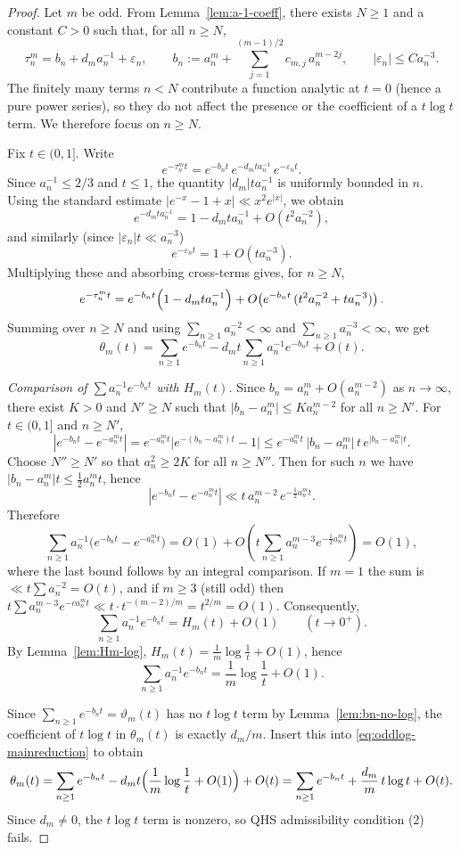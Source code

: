 \documentclass[11pt,letterpaper]{amsart}
\numberwithin{equation}{section}
\theoremstyle{definition}
\begin{document}
\begin{proof}
Let $m$ be odd. From Lemma~\ref{lem:a-1-coeff}, there exists $N\ge1$ and a constant $C>0$ such that,
for all $n\ge N$,
\[
\tau_n^m = b_n + d_m a_n^{-1} + \varepsilon_n,
\qquad
b_n:=a_n^m+\sum_{j=1}^{(m-1)/2} c_{m,j}\,a_n^{m-2j},
\qquad
|\varepsilon_n|\le C a_n^{-3}.
\]
The finitely many terms $n<N$ contribute a function analytic at $t=0$ (hence a pure power series),
so they do not affect the presence or the coefficient of a $t\log t$ term. We therefore focus on $n\ge N$.

Fix $t\in(0,1]$. Write
\[
e^{-\tau_n^m t}=e^{-b_n t}\,e^{-d_m t a_n^{-1}}\,e^{-\varepsilon_n t}.
\]
Since $a_n^{-1}\le 2/3$ and $t\le1$, the quantity $|d_m|t a_n^{-1}$ is uniformly bounded in $n$.
Using the standard estimate $|e^{-x}-1+x|\ll x^2 e^{|x|}$, we obtain
\[
e^{-d_m t a_n^{-1}} = 1 - d_m t a_n^{-1} + O(t^2 a_n^{-2}),
\]
and similarly (since $|\varepsilon_n|t\ll a_n^{-3}$)
\[
e^{-\varepsilon_n t}=1+O(t a_n^{-3}).
\]
Multiplying these and absorbing cross-terms gives, for $n\ge N$,
\[
e^{-\tau_n^m t}
= e^{-b_n t}\Bigl(1-d_m t a_n^{-1}\Bigr)+O\!\left(e^{-b_n t}\,(t^2 a_n^{-2}+t a_n^{-3})\right).
\]
Summing over $n\ge N$ and using $\sum_{n\ge1}a_n^{-2}<\infty$ and $\sum_{n\ge1}a_n^{-3}<\infty$, we get
\begin{equation}\label{eq:oddlog-mainreduction}
\theta_m(t)
=\sum_{n\ge1}e^{-b_n t} - d_m t\sum_{n\ge1}a_n^{-1}e^{-b_n t} + O(t).
\end{equation}

\medskip
\noindent\emph{Comparison of $\sum a_n^{-1}e^{-b_n t}$ with $H_m(t)$.}
Since $b_n=a_n^m+O(a_n^{m-2})$ as $n\to\infty$, there exist $K>0$ and $N'\ge N$ such that
$|b_n-a_n^m|\le K a_n^{m-2}$ for all $n\ge N'$. For $t\in(0,1]$ and $n\ge N'$,
\[
|e^{-b_n t}-e^{-a_n^m t}|
=e^{-a_n^m t}\bigl|e^{-(b_n-a_n^m)t}-1\bigr|
\le e^{-a_n^m t}\,|b_n-a_n^m|\,t\,e^{|b_n-a_n^m|t}.
\]
Choose $N''\ge N'$ so that $a_n^2\ge 2K$ for all $n\ge N''$. Then for such $n$ we have
$|b_n-a_n^m|t\le \frac12 a_n^m t$, hence
\[
|e^{-b_n t}-e^{-a_n^m t}|\ll t\,a_n^{m-2}\,e^{-\frac12 a_n^m t}.
\]
Therefore
\[
\sum_{n\ge1}a_n^{-1}\bigl(e^{-b_n t}-e^{-a_n^m t}\bigr)
=O(1)+O\!\left(t\sum_{n\ge1}a_n^{m-3}e^{-\frac12 a_n^m t}\right)=O(1),
\]
where the last bound follows by an integral comparison. If $m=1$ the sum is $\ll t\sum a_n^{-2}=O(t)$,
and if $m\ge3$ (still odd) then
$t\sum a_n^{m-3}e^{-c a_n^m t}\ll t\cdot t^{-(m-2)/m}=t^{2/m}=O(1)$.
Consequently,
\[
\sum_{n\ge1}a_n^{-1}e^{-b_n t}=H_m(t)+O(1)\qquad(t\to0^+).
\]
By Lemma~\ref{lem:Hm-log}, $H_m(t)=\frac{1}{m}\log\frac{1}{t}+O(1)$, hence
\[
\sum_{n\ge1}a_n^{-1}e^{-b_n t}=\frac{1}{m}\log\frac{1}{t}+O(1).
\]

Since $\sum_{n\ge1}e^{-b_n t}=\vartheta_m(t)$ has no $t\log t$ term by Lemma~\ref{lem:bn-no-log},
the coefficient of $t\log t$ in $\theta_m(t)$ is exactly $d_m/m$.
Insert this into \eqref{eq:oddlog-mainreduction} to obtain
\[
\theta_m(t)
=\sum_{n\ge1}e^{-b_n t} - d_m t\Bigl(\frac{1}{m}\log\frac{1}{t}+O(1)\Bigr)+O(t)
=\sum_{n\ge1}e^{-b_n t}+\frac{d_m}{m}\,t\log t+O(t).
\]
Since $d_m\neq0$, the $t\log t$ term is nonzero, so QHS admissibility condition (2) fails.
\end{proof}
\end{document}
